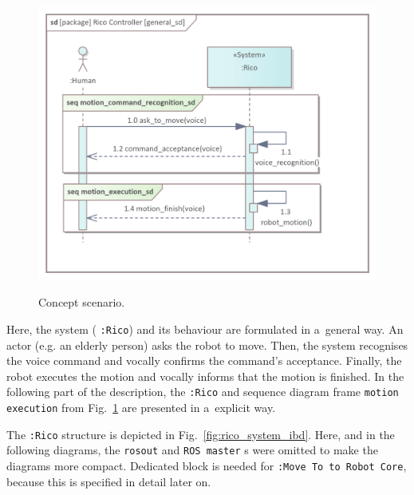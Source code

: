 \documentclass[11pt,oneside,a4paper]{report}
\begin{document}
	\begin{figure}[H] 
		\centering
		\begin{center}
			{\includegraphics[scale=.9]{img/rico_pkg/general_sd.png}}
		\end{center}
		\caption{Concept scenario.} 
		\label{fig:general_sd}
	\end{figure}
	
	Here, the system (\stSystem{} \texttt{:Rico}) and its behaviour are formulated in a~general way. An actor (e.g. an elderly person) asks the robot to move. Then, the system recognises the voice command and vocally confirms the command's acceptance. Finally, the robot executes the motion and vocally informs that the motion is finished.
	In the following part of the description, the \stSystem{} \texttt{:Rico} and sequence diagram frame \texttt{motion execution} from Fig.~\ref{fig:general_sd} are presented in a~explicit way.
	
		The \stSystem{} \texttt{:Rico} structure is depicted in Fig.~\ref{fig:rico_system_ibd}. Here, and in the following diagrams, the \texttt{rosout} and \texttt{ROS master} \stNode{}s were omitted to make the diagrams more compact. Dedicated block is needed for \stCommChannel{} \texttt{:Move To to Robot Core}, because this \stCommChannel{} is specified in detail later on.
	
\end{document}
